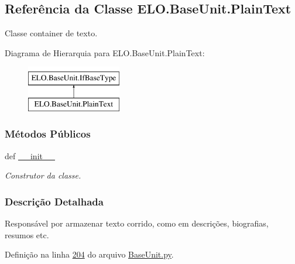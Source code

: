 \hypertarget{classELO_1_1BaseUnit_1_1PlainText}{\subsection{Referência da Classe E\-L\-O.\-Base\-Unit.\-Plain\-Text}
\label{classELO_1_1BaseUnit_1_1PlainText}
}


Classe container de texto.  


Diagrama de Hierarquia para E\-L\-O.\-Base\-Unit.\-Plain\-Text\-:\begin{figure}[H]
\begin{center}
\leavevmode
\includegraphics[height=2.000000cm]{d4/d2d/classELO_1_1BaseUnit_1_1PlainText}
\end{center}
\end{figure}
\subsubsection*{Métodos Públicos}
\begin{DoxyCompactItemize}
\item 
def \hyperlink{classELO_1_1BaseUnit_1_1PlainText_a2cd4f19585b5e8e8279f8052307d031f}{\-\_\-\-\_\-init\-\_\-\-\_\-}
\begin{DoxyCompactList}\small\item\em Construtor da classe. \end{DoxyCompactList}\end{DoxyCompactItemize}


\subsubsection{Descrição Detalhada}
Responsável por armazenar texto corrido, como em descrições, biografias, resumos etc. 

Definição na linha \hyperlink{BaseUnit_8py_source_l00204}{204} do arquivo \hyperlink{BaseUnit_8py_source}{Base\-Unit.\-py}.



